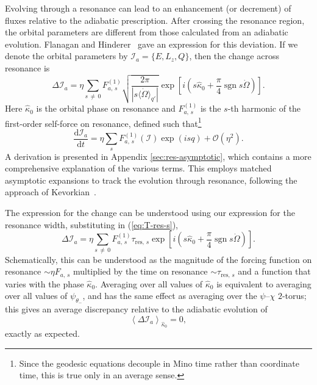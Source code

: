 \documentclass[aps,prd,amsfonts,amssymb,amsmath,nofootinbib,reprint,showpacs,superscriptaddress,twocolumn]{revtex4}
\newcommand{\eqnref}[1]{(\ref{eq:#1})}
\newcommand{\apref}[1]{Appendix \ref{sec:#1}}
\newcommand{\dd}{\ensuremath{\mathrm{d}}}
\newcommand{\diff}[2]{\ensuremath{\dfrac{\dd {#1}}{\dd {#2}}}}
\newcommand{\order}[1]{\ensuremath{\mathcal{O}({#1})}}
\DeclareMathOperator{\sgn}{sgn}
\begin{document}
Evolving through a resonance can lead to an enhancement (or decrement) of fluxes relative to the adiabatic prescription. After crossing the resonance region, the orbital parameters are different from those calculated from an adiabatic evolution. Flanagan and Hinderer~\cite{Flanagan2012} gave an expression for this deviation. If we denote the orbital parameters by $\mathcal{I}_a = \{E,L_z,Q\}$, then the change across resonance is
\begin{equation}
\Delta \mathcal{I}_a = \eta\sum_{s\,\neq\,0}F_{a,\,s}^{(1)}\sqrt{\dfrac{2\pi}{\left|s \langle\dot{\Omega}\rangle_{q'}\right|}}\exp\left[i\left(s \widehat{\kappa}_0 + \dfrac{\pi}{4} \sgn s\dot{\Omega}\right)\right]. 
\end{equation}
Here $\widehat{\kappa}_0$ is the orbital phase on resonance and $F_{a,\,s}^{(1)}$ is the $s$-th harmonic of the first-order self-force on resonance, defined such that\footnote{Since the geodesic equations decouple in Mino time rather than coordinate time, this is true only in an average sense.}
\begin{equation}
\diff{\mathcal{I}_a}{t} = \eta\sum_s F_{a,\,s}^{(1)}(\boldsymbol{\mathcal{I}})\exp(is q) + \order{\eta^2}.
\end{equation}
A derivation is presented in \apref{res-asymptotic}, which contains a more comprehensive explanation of the various terms. This employs matched asymptotic expansions to track the evolution through resonance, following the approach of Kevorkian~\cite{Kevorkian1987}.

The expression for the change can be understood using our expression for the resonance width, substituting in \eqnref{T-res-s},
\begin{equation}
\label{eq:delta-I-a}
\Delta \mathcal{I}_a = \eta\sum_{s\,\neq\,0}F_{a,\,s}^{(1)}\tau_{\mathrm{res},\,s}\exp\left[i\left(s \widehat{\kappa}_0 + \dfrac{\pi}{4} \sgn s\dot{\Omega}\right)\right]. 
\end{equation}
Schematically, this can be understood as the magnitude of the forcing function on resonance $\sim \eta F_{a,\,s}$ multiplied by the time on resonance $\sim \tau_{\mathrm{res},\,s}$ and a function that varies with the phase $\widehat{\kappa}_0$. Averaging over all values of $\widehat{\kappa}_0$ is equivalent to averaging over all values of $\psi_{\theta_-}$, and has the same effect as averaging over the $\psi$--$\chi$ $2$-torus; this gives an average discrepancy relative to the adiabatic evolution of
\begin{equation}
\left\langle \Delta \mathcal{I}_a \right\rangle_{\hat{\kappa}_0} = 0,
\end{equation}
exactly as expected.
\end{document}
